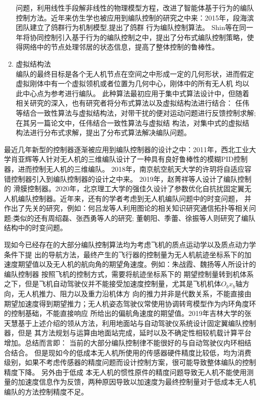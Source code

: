 \begin{enumerate}
        问题，利用线性手段解非线性的物理模型方程，改进了智能体基于行为的编队控制方法。\cite{SongYunZhong2012}近年来仿生学也被应用到编队控制的研究之中来：2015年，段海滨团队建立了鸽群行为机制模型,提出了鸽群
        行为编队控制算法。\cite{DuanHaiBin2015}
        Shin等在同一年将协同控制引入基于行为的编队控制之中，提出了分布式编队控制策略，使得网络中的节点处理邻居的状态信息，提高了整体控制的鲁棒性。\cite{Jongho2015}
    \item 虚拟结构法\\
        编队的最终目标是各个无人机节点在空间之中形成一定的几何形状，进而假定虚拟刚体中有一个虚拟领机或者位置为几何中心，刚体中的所有无人机
        均以此中心点为参考进行编队。\cite{Lewis1997High}
        此种算法最初应用于集中式算法设计中，但随着相关研究的深入，也有研究者将分布式算法以及虚拟结构法进行结合：
        任伟等结合一致性算法与虚拟结构法，对带干扰的便对运动问题进行反馈控制求解\cite{Ren2004Formation};在其另一篇论文中，任伟结合一致性算法与虚拟结
        构法，对集中式的虚拟结构法进行分布式求解，提出了分布式算法解决编队问题。\cite{Ren2004Decentralized}
\end{enumerate}

最近几年新型的控制器逐渐被应用到编队控制器的设计之中：2011年，西北工业大学肖亚辉等人针对无人机的三维编队设计了一种具有良好鲁棒性的模糊PID控制器，进而控制无人机的三维编队。\cite{XiaoYaHui2011}
2018年，南京航空航天大学的许玥将自适应容错控制器引入到编队控制器的设计之中来。\cite{XuYue} 2019年，赵菁祥等人设计了编队控制的
滑膜控制器。2020年，北京理工大学的强佳久设计了参数优化自抗扰固定翼无人机编队控制器。\cite{MengXiuyun2020}近年来，还有的学者考虑到无人机编队问题中的时变问题，
并作出了先关的研究，例如：何吕龙等人利用图论的相关知识研究通信拓扑等相关问题\cite{Helvlong2020};类似的还有周绍磊\cite{Zhoushaolei2020}、张西勇\cite{Zhangxiyong2019}等人的研究;
董朝阳\cite{Dongzhaoyang2020}、季蕾\cite{Jilei2019}、徐振\cite{Xuzhen2019}等人则研究了编队结构中的时变问题。

现如今已经存在的大部分编队控制算法均为考虑飞机的质点运动学以及质点动力学条件下提
出的导航方法，最终产生的飞行器的控制量为无人机航迹坐标系下的加速度期望值以及无人机的航向角的期望角速度。例如：朱战霞、魏扬等人所设计的编队控制器
按照飞机的控制方式，需要将航迹坐标系下的
期望控制量转到机体系之下，但是飞机自动驾驶仪并不能接受加速度控制量，尤其是飞机机体$O_bx_b$轴方向，无人机推力、阻力以及重力沿机体方
向的推力并非是代数关系，不能直接由期望加速度得到期望推力；无人机姿态驾驶仪常使用协调转弯模型作为内环角度环的控制基础，不能直接响应
所给出的偏航角速度的期望值。2019年吉林大学的张天慧基于上述介绍的领从方法，利用地面站与自动驾驶仪系统设计固定翼编队控制器，\cite{Zhangtianhui2019}但是
其方法规划与运算由地面站完成，延时以及不确定性相较机载计算平台增加。总结而言即：
当前的大部分编队控制律不能很好的与自动驾驶仪内环相结合结合。
但是现如今的低成本无人机所使用的传感器硬件精度比较低，均为消费级别，如果不考虑传感器的精度问题而设计控制方案，很可能导致整体编队的控制精度下降。
另外由于低成
本无人机的惯性原件的精度问题导致无人机不能使用测量的加速度信息作为反馈，两种原因导致以加速度为最终控制量对于低成本无人机编队的方法控制精度不足。
